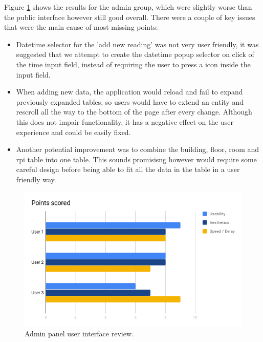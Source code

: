 \documentclass{l4proj}
\begin{document}
Figure \ref{fig:adminrev} shows the results for the admin group, which were slightly worse than the public interface however still good overall. There were a couple of key issues that were the main cause of most missing points:
\begin{itemize}	
  \item Datetime selector for the 'add new reading' was not very user friendly, it was suggested that we attempt to create the datetime popup selector on click of the time input field, instead of requiring the user to press a icon inside the input field.
  \item When adding new data, the application would reload and fail to expand previously expanded tables, so users would have to extend an entity and rescroll all the way to the bottom of the page after every change. Although this does not impair functionality, it has a negative effect on the user experience and could be easily fixed.
  \item Another potential improvement was to combine the building, floor, room and rpi table into one table. This sounds promisisng however would require some careful design before being able to fit all the data in the table in a user friendly way.
\end{itemize}
	
\begin{figure}
\centering
\includegraphics[width=\textwidth]{adminrev}
\caption{Admin panel user interface review.}
\label{fig:adminrev}
\end{figure}
\end{document}
